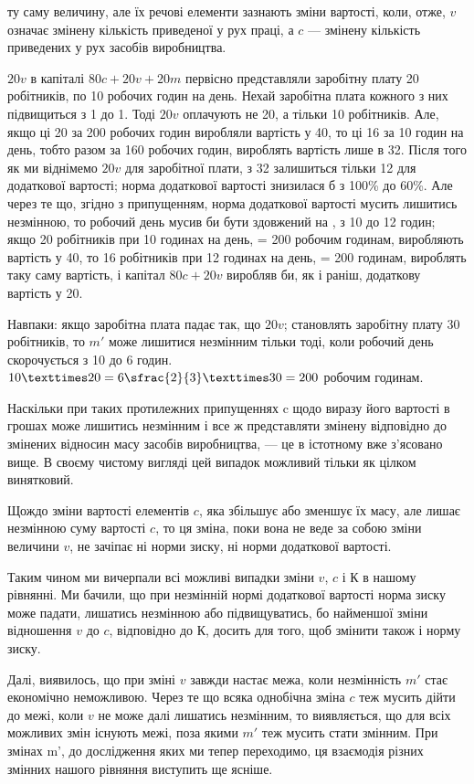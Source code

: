 \parcont{}  %
ту саму величину, але їх речові елементи зазнають зміни вартості,
коли, отже, $v$ означає змінену кількість приведеної у рух
праці, а $c$ — змінену кількість приведених у рух засобів виробництва.

$20v$ в капіталі $80c + 20v + 20m$ первісно представляли заробітну
плату 20 робітників, по 10 робочих годин на день. Нехай
заробітна плата кожного з них підвищиться з 1 до 1. Тоді $20v$
оплачують не 20, а тільки 10 робітників. Але, якщо ці 20 за
200 робочих годин виробляли вартість у 40, то ці 16 за 10 годин
на день, тобто разом за 160 робочих годин, вироблять вартість
лише в 32. Після того як ми віднімемо $20v$ для заробітної
плати, з 32 залишиться тільки 12 для додаткової вартості; норма
додаткової вартості знизилася б з 100\% до 60\%. Але через
те що, згідно з припущенням, норма додаткової вартості мусить
лишитись незмінною, то робочий день мусив би бути здовжений
на , з 10 до 12 годин; якщо 20 робітників при 10 годинах
на день, = 200 робочим годинам, виробляють вартість у 40, то
16 робітників при 12 годинах на день, = 200 годинам, вироблять
таку саму вартість, і капітал $80c + 20v$ виробляв би, як і раніш,
додаткову вартість у 20.

Навпаки: якщо заробітна плата падає так, що $20v$; становлять
заробітну плату 30 робітників, то $m'$ може лишитися
незмінним тільки тоді, коли робочий день скорочується з 10
до 6 годин. $10 × 20 = 6\sfrac{2}{3} × 30 = 200$ робочим годинам.

Наскільки при таких протилежних припущеннях c щодо виразу
його вартості в грошах може лишитись незмінним і все ж
представляти змінену відповідно до змінених відносин масу
засобів виробництва, — це в істотному вже з’ясовано вище.
В своєму чистому вигляді цей випадок можливий тільки як цілком
винятковий.

Щождо зміни вартості елементів $c$, яка збільшує або зменшує
їх масу, але лишає незмінною суму вартості $c$, то ця зміна, поки
вона не веде за собою зміни величини $v$, не зачіпає ні норми
зиску, ні норми додаткової вартості.

Таким чином ми вичерпали всі можливі випадки зміни $v$, $c$
і $К$ в нашому рівнянні. Ми бачили, що при незмінній нормі додаткової
вартості норма зиску може падати, лишатись незмінною
або підвищуватись, бо найменшої зміни відношення $v$ до $c$,
відповідно до $К$, досить для того, щоб змінити також і норму
зиску.

Далі, виявилось, що при зміні $v$ завжди настає межа, коли незмінність
$m'$ стає економічно неможливою. Через те що всяка
однобічна зміна $c$ теж мусить дійти до межі, коли $v$ не може
далі лишатись незмінним, то виявляється, що для всіх можливих
змін  існують межі, поза якими $m'$ теж мусить стати змінним.
При змінах m', до дослідження яких ми тепер переходимо, ця
взаємодія різних змінних нашого рівняння виступить ще ясніше.
